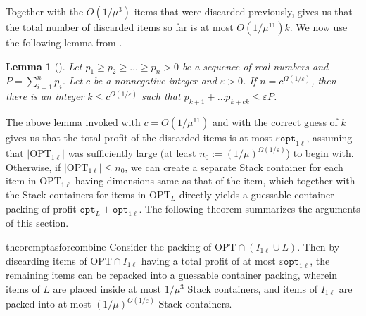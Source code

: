 \documentclass[10pt,a4paper]{amsart}
\newcommand{\kvnnew}[1]{\textcolor{black}{#1}}
\newcommand{\akr}[1]{}
\renewcommand{\epsilon}{\varepsilon} %
\newtheorem{lemma}[theorem]{Lemma}
\theoremstyle{definition}
\newcommand{\hmax}{\mu}
\newcommand{\opt}{\mathtt{opt}}
\newcommand{\optonel}{\mathtt{opt}_{1\ell}}
\newcommand{\OPT}{\mathrm{OPT}}
\newcommand{\OPTonel}{\text{OPT}_{1\ell}}
\newcommand{\OPTL}{\text{OPT}_L}
\begin{document}
Together with the $O(1/\mu^3)$ items that were discarded previously,  gives us that the total number of discarded items so far is at most $O(1/\mu^{11})k$. We now use the following lemma from \cite{jansen1999improved}.
\begin{lemma}[\cite{jansen1999improved}]
    Let $p_1\ge p_2\ge \ldots \ge p_n>0$ be a sequence of real numbers and $P=\sum_{i=1}^{n} p_i$. Let $c$ be a nonnegative integer and $\epsilon >0$. If $n = c^{\Omega(1/\epsilon)}$, then there is an integer $k \le c^{O(1/\epsilon)}$ such that $p_{k+1}+\ldots p_{k+ck} \le \epsilon P$.
    
\end{lemma}


The above lemma invoked with $c=O(1/\hmax^{11})$ and with the correct guess of $k$ gives us that the total profit of the discarded items is at most $\epsilon \optonel$, assuming that $|\OPTonel|$ was sufficiently large (at least $n_0 := (1/\mu)^{\Omega(1/\epsilon)}$) to begin with. Otherwise, if $|\OPTonel| \le n_0$, we can create a separate Stack container for each item in $\OPTonel$ having dimensions same as that of the item, which together with the Stack containers for items in $\OPTL$ directly yields a guessable container packing of profit $\opt_L + \optonel$. The following theorem summarizes the arguments of this section.

\begin{restatable}{theorem}{ptasforcombine}
    Consider the packing of $\OPT\cap (I_{1\ell}\cup L)$.
    Then by discarding items of $\OPT\cap I_{1\ell}$ having a total profit of at most $\epsilon\optonel$, the remaining items can be repacked into a guessable container packing, wherein items of $L$ are placed inside at most $1/\hmax^3$ \kvnnew{Stack} containers, and items of $I_{1\ell}$ are packed into at most $(1/\mu)^{O(1/\epsilon)}$ Stack containers.
\end{restatable}




\end{document}

